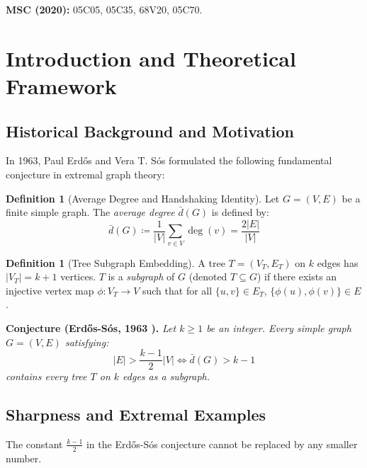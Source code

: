 \documentclass[11pt,a4paper]{article}
\theoremstyle{definition}
\newtheorem{definition}[theorem]{Definition}
\begin{document}
\noindent\textbf{MSC (2020):} 05C05, 05C35, 68V20, 05C70.

\tableofcontents
\newpage

\section{Introduction and Theoretical Framework}

\subsection{Historical Background and Motivation}
In 1963, Paul Erd\H{o}s and Vera T. S\'os \cite{erdos1963sos} formulated the following fundamental conjecture in extremal graph theory:

\begin{definition}[Average Degree and Handshaking Identity]\label{def:avg_deg}
Let $G = (V, E)$ be a finite simple graph.
The \emph{average degree} $\bar{d}(G)$ is defined by:
\begin{equation}\label{eq:avg_deg}
\bar{d}(G) \coloneqq \frac{1}{|V|} \sum_{v \in V} \deg(v) = \frac{2 |E|}{|V|}
\end{equation}
\end{definition}

\begin{definition}[Tree Subgraph Embedding]\label{def:tree_emb}
A tree $T = (V_T, E_T)$ on $k$ edges has $|V_T| = k + 1$ vertices.
$T$ is a \emph{subgraph} of $G$ (denoted $T \subseteq G$) if there exists an injective vertex map $\phi : V_T \to V$ such that for all $\{u, v\} \in E_T$, $\{\phi(u), \phi(v)\} \in E$.
\end{definition}

\noindent\textbf{Conjecture (Erd\H{o}s-S\'os, 1963 \cite{erdos1963sos}).} \textit{Let $k \ge 1$ be an integer. Every simple graph $G = (V, E)$ satisfying:}
\begin{equation}\label{eq:erdos_sos_hyp}
|E| > \frac{k - 1}{2} |V| \iff \bar{d}(G) > k - 1
\end{equation}
\textit{contains every tree $T$ on $k$ edges as a subgraph.}

\subsection{Sharpness and Extremal Examples}
The constant $\frac{k-1}{2}$ in the Erd\H{o}s-S\'os conjecture cannot be replaced by any smaller number.
\end{document}
